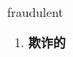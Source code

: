 
\begin{frame}
{\huge fraudulent}
\begin{center}
\begin{enumerate}\Large
  \item \textbf{欺诈的}
\end{enumerate}
\end{center}
\end{frame}
